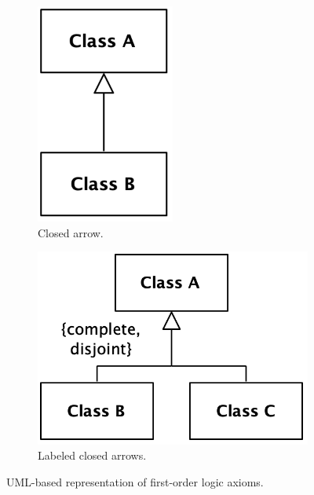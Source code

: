 \documentclass{article}
\begin{document}
\begin{figure}
    \centering
    \begin{subfigure}[b]{0.3\textwidth}
        \centering
        \includegraphics[width=0.5\textwidth]{diagrams/Conventions_Specialization.png}
        \caption{Closed arrow.}
        \label{fig:diagram_conventions_closed_arrow}
    \end{subfigure}
    \qquad
    \centering
    \begin{subfigure}[b]{0.35\textwidth}
        \centering
        \includegraphics[width=\textwidth]{diagrams/Conventions_Generalization_Set.png}
        \caption{Labeled closed arrows.}
        \label{fig:diagram_conventions_labeled_arrow}
    \end{subfigure}
    \caption{UML-based representation of first-order logic axioms.}\label{fig:diagram_conventions}
\end{figure}
\end{document}
